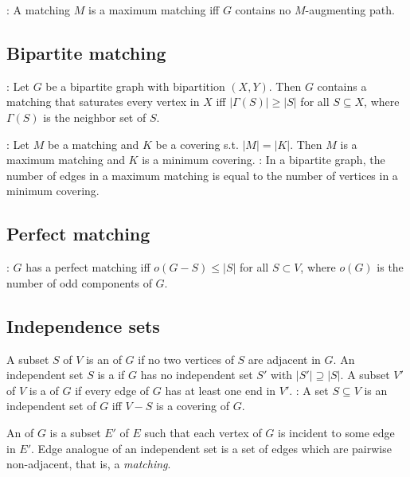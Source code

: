 \w {}: A matching $M$ is a maximum matching iff
$G$ contains no $M$-augmenting path.

\eit

\subsection{Bipartite matching}
\bit
\w {}: 
   Let $G$ be a bipartite graph with bipartition $(X, Y)$. Then
$G$ contains a matching that saturates every vertex in $X$ iff
   $|\Gamma(S)| \ge |S|$ for all $S \subseteq X$, where $\Gamma(S)$ is the
   neighbor 
   set of $S$. 

\w {}: Let $M$ be a matching and $K$ be a covering
   s.t. $|M| = |K|$.  
   Then $M$ is a maximum matching and $K$ is a minimum covering.  
\w {}: In a bipartite graph, the number of edges in a maximum
   matching is equal to the number of vertices in a minimum covering.
\eit

\subsection{Perfect matching}
\bit
\w {}: $G$ has a perfect matching iff
  $o(G - S) \le |S|$ for all $S \subset V$, where $o(G)$ is the number of odd
  components of $G$. 
\eit

\subsection{Independence sets}
\bit
\w A subset $S$ of $V$ is an  of $G$ if no two
vertices of $S$ are adjacent in $G$. 
An independent set $S$ is a  if
	$G$ has no independent set $S'$ with $|S'| \supseteq |S|$.
\w A subset $V'$ of $V$ is a  of $G$ if every edge
of $G$ has at least one end in $V'$.
: 
A set $S \subseteq V$ is an independent set of $G$ iff $V -
S$ is a covering of $G$.

\w An  of $G$ is a subset $E'$ of $E$ such that
each vertex of $G$ is incident to some edge in $E'$.
\w Edge analogue of an independent set is a set of edges which are
pairwise non-adjacent, that is, a {\em matching\/}.
\eit

